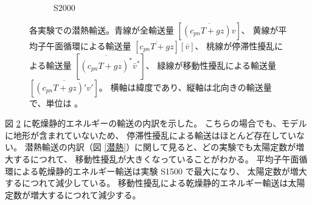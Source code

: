 \documentclass[body]{subfiles}
\begin{document}
\begin{figure}[t]
\begin{subfigure}{.4\textwidth}
		\caption{S2000}\label{乾燥静的エネルギーS2000}
	\end{subfigure}
	\caption[各実験での乾燥静的エネルギー輸送の内訳]{
		各実験での潜熱輸送。青線が全輸送量 \([\overline{(c_{pn}T+gz)v}]\)、
		黄線が平均子午面循環による輸送量 \([\overline{c_{pn}T+gz}][\overline{v}]\)、
		桃線が停滞性擾乱による輸送量 \([\overline{(c_{pn}T+gz)^*}\bar v^*]\)、
		緑線が移動性擾乱による輸送量 \([\overline{(c_{pn}T+gz)'v'}]\)。
		横軸は緯度であり、縦軸は北向きの輸送量で、単位は 。
	}\label{乾燥静的エネルギー}
\end{figure}

図 \ref{乾燥静的エネルギー} に乾燥静的エネルギーの輸送の内訳を示した。
こちらの場合でも、モデルに地形が含まれていないため、
停滞性擾乱による輸送はほとんど存在していない。
潜熱輸送の内訳（図 \ref{潜熱}）に関して見ると、どの実験でも太陽定数が増大するにつれて、
移動性擾乱が大きくなっていることがわかる。
平均子午面循環による乾燥静的エネルギー輸送は実験 S1500 で最大になり、
太陽定数が増大するにつれて減少している。
移動性擾乱による乾燥静的エネルギー輸送は太陽定数が増大するにつれて減少する。
\end{document}
